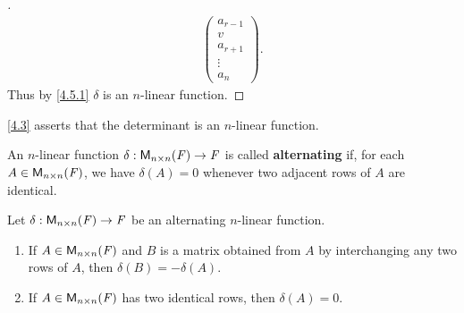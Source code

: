 \begin{proof}[]
\begin{align*}
\begin{pmatrix}
                                                              a_{r - 1} \\
                                                              v         \\
                                                              a_{r + 1} \\
                                                              \vdots    \\
                                                              a_n
                                                            \end{pmatrix}.
  \end{align*}
  Thus by \cref{4.5.1} \(\delta\) is an \(n\)-linear function.
\end{proof}

\begin{note}
  \cref{4.3} asserts that the determinant is an \(n\)-linear function.
\end{note}

\begin{defn}\label{4.5.5}
  An \(n\)-linear function \(\delta : \ms[n][n][\F] \to \F\) is called \textbf{alternating} if, for each \(A \in \ms[n][n][\F]\), we have \(\delta(A) = 0\) whenever two adjacent rows of \(A\) are identical.
\end{defn}

\begin{thm}\label{4.10}
  Let \(\delta : \ms[n][n][\F] \to \F\) be an alternating \(n\)-linear function.
  \begin{enumerate}
    \item If \(A \in \ms[n][n][\F]\) and \(B\) is a matrix obtained from \(A\) by interchanging any two rows of \(A\), then \(\delta(B) = -\delta(A)\).
    \item If \(A \in \ms[n][n][\F]\) has two identical rows, then \(\delta(A) = 0\).
  \end{enumerate}
\end{thm}

